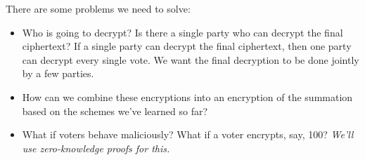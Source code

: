 There are some problems we need to solve:
\begin{itemize}
    \item Who is going to decrypt? Is there a single party who can decrypt the final ciphertext? If a single party can decrypt the final ciphertext, then one party can decrypt every single vote. We want the final decryption to be done jointly by a few parties.
    \item How can we combine these encryptions into an encryption of the summation based on the schemes we've learned so far?
    \item What if voters behave maliciously? What if a voter encrypts, say, 100? \emph{We'll use zero-knowledge proofs for this.}
\end{itemize}